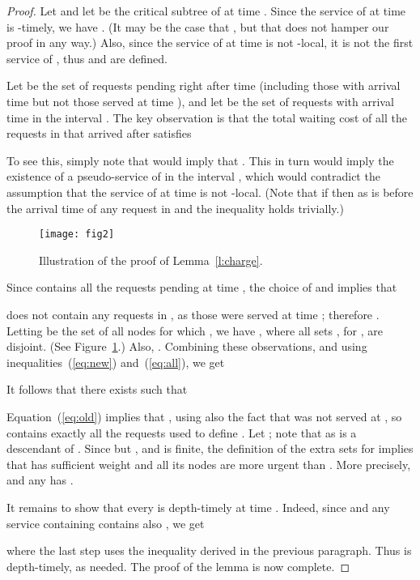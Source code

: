 \documentclass[a4paper]{article}
\begin{document}
\begin{proof}
Let  and let  be the 
critical subtree of  at time .
Since the service of  at time  is -timely, we have .
(It may be the case that , but that does not
hamper our proof in any way.)
Also, since the service of  at time  is not -local,
 it is not the first service of , thus  and
 are defined.  

Let  be the set of requests pending right after
time  (including those with arrival time  but not those
served at time ), and let  be the set of requests 
with arrival time in the interval .
The key observation is that the total waiting cost of all the requests
in  that arrived after  satisfies

To see this, simply note that 
would imply that .
This in turn would
imply the existence of a pseudo-service of  in the interval
, which would
contradict the assumption that the service of  at time 
is not -local. (Note that if  then 
as  is before the arrival time of any request in  and the
inequality holds trivially.)



\begin{figure}
\begin{center}
\texttt{[image: fig2]}
\caption{Illustration of the proof of Lemma~\ref{l:charge}.}
\label{fig: online mlap analysis}
\end{center}
\end{figure}


Since  contains all the requests pending at time ,
the choice of  and  implies that

 does not contain any requests in , as those were served at time ;
therefore .
Letting  be the set of all nodes  for which ,
we have , where all sets , for ,
are disjoint. (See Figure~\ref{fig: online mlap analysis}.)
Also, . Combining these observations, and
using inequalities~(\ref{eq:new}) and~(\ref{eq:all}), we get

It follows that there exists  such that 

Equation~(\ref{eq:old}) implies that , 
using also the fact that  was not served at , so
 contains exactly all the requests used to define
.  Let ; note that  as 
is a descendant of . Since  but , and
 is finite, the definition of the extra sets for 
implies that  has sufficient weight and all its nodes
are more urgent than . More precisely,  and any  has . 


It remains to show that every  is depth-timely at time .
Indeed, since  and any service containing  contains also , we get

where the last step uses the inequality 
derived in the previous paragraph. Thus  is depth-timely, as needed.
The proof of the lemma is now complete.
\end{proof}
\end{document}
